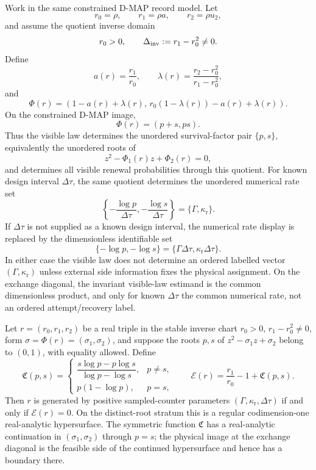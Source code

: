 \begin{paperthm}\label{thm:toeplitz_image_inverse_duality}
Work in the same constrained D-MAP record model.  Let
\[
r_0=\rho,\qquad r_1=\rho a,\qquad r_2=\rho u_2,
\]
and assume the quotient inverse domain
\[
r_0>0,\qquad \Delta_{\rm inv}:=r_1-r_0^2\ne0 .
\]
Define
\[
a(r)=\frac{r_1}{r_0},\qquad
\lambda(r)=\frac{r_2-r_0^2}{r_1-r_0^2},
\]
and
\[
\Phi(r)=
\left(1-a(r)+\lambda(r),\,
r_0(1-\lambda(r))-a(r)+\lambda(r)\right).
\]
On the constrained D-MAP image,
\[
\Phi(r)=(p+s,ps).
\]
Thus the visible law determines the unordered survival-factor pair
\(\{p,s\}\), equivalently the unordered roots of
\[
z^2-\Phi_1(r)z+\Phi_2(r)=0,
\]
and determines all visible renewal probabilities through this quotient.  For
known design interval \(\Delta\tau\), the same quotient determines the
unordered numerical rate set
\[
\left\{-\frac{\log p}{\Delta\tau},-\frac{\log s}{\Delta\tau}\right\}
=\{\Gamma,\kappa_{\mathrm r}\}.
\]
If \(\Delta\tau\) is not supplied as a known design interval, the numerical
rate display is replaced by the dimensionless identifiable set
\[
\{-\log p,-\log s\}
=\{\Gamma\Delta\tau,\kappa_{\mathrm r}\Delta\tau\}.
\]
In either case the visible law does not determine an ordered labelled vector
\((\Gamma,\kappa_{\mathrm r})\) unless external side information fixes the
physical assignment.  On the exchange diagonal, the
invariant visible-law estimand is the common dimensionless product, and only
for known \(\Delta\tau\) the common numerical rate, not an ordered
attempt/recovery label.
\end{paperthm}

\begin{proposition}
\label{prop:exact-three-inclusion-image-main}
Let \(r=(r_0,r_1,r_2)\) be a real triple in the stable inverse chart
\(r_0>0\), \(r_1-r_0^2\ne0\), form
\(\sigma=\Phi(r)=(\sigma_1,\sigma_2)\), and suppose the roots \(p,s\) of
\(z^2-\sigma_1z+\sigma_2\) belong to \((0,1)\), with equality allowed.  Define
\[
\mathfrak C(p,s)=
\begin{cases}
\dfrac{s\log p-p\log s}{\log p-\log s},&p\ne s,\\[6pt]
p(1-\log p),&p=s,
\end{cases}
\qquad
\mathcal E(r)=\frac{r_1}{r_0}-1+\mathfrak C(p,s).
\]
Then \(r\) is generated by positive sampled-counter parameters
\((\Gamma,\kappa_{\mathrm r},\Delta\tau)\) if and only if
\(\mathcal E(r)=0\).  On the distinct-root stratum this is a regular
codimension-one real-analytic hypersurface.  The symmetric function
\(\mathfrak C\) has a real-analytic continuation in \((\sigma_1,\sigma_2)\)
through \(p=s\); the physical image at the exchange diagonal is the feasible
side of the continued hypersurface and hence has a boundary there.
\end{proposition}

